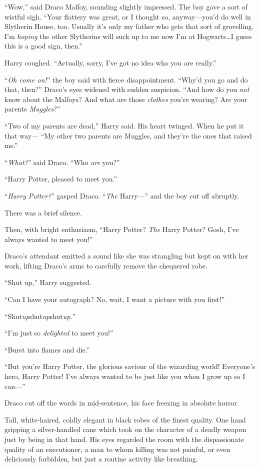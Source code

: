“Wow,” said Draco Malfoy, sounding slightly impressed. The boy gave a sort of wistful sigh. “Your flattery was great, or I thought so, anyway—you’d do well in Slytherin House, too. Usually it’s only my father who gets that sort of grovelling. I’m \emph{hoping} the other Slytherins will suck up to me now I’m at Hogwarts…I guess this is a good sign, then.”

Harry coughed. “Actually, sorry, I’ve got no idea who you are really.”

“\emph{Oh come on!}” the boy said with fierce disappointment. “Why’d you go and do that, then?” Draco’s eyes widened with sudden suspicion. “And how do you \emph{not} know about the Malfoys? And what are those \emph{clothes} you’re wearing? Are your parents \emph{Muggles}?”

“Two of my parents are dead,” Harry said. His heart twinged. When he put it that way— “My other two parents are Muggles, and they’re the ones that raised me.”

“\emph{What?}” said Draco. “Who \emph{are} you?”

“Harry Potter, pleased to meet you.”

“\emph{Harry Potter?}” gasped Draco. “\emph{The} Harry—” and the boy cut off abruptly.

There was a brief silence.

Then, with bright enthusiasm, “Harry Potter? \emph{The} Harry Potter? Gosh, I’ve always wanted to meet you!”

Draco’s attendant emitted a sound like she was strangling but kept on with her work, lifting Draco’s arms to carefully remove the chequered robe.

“Shut up,” Harry suggested.

“Can I have your autograph? No, wait, I want a picture with you first!”

“Shut\emph{up}shut\emph{up}shut\emph{up.}”

“I’m just so \emph{delighted} to meet you!”

“Burst into flames and die.”

“But you’re Harry Potter, the glorious saviour of the wizarding world! Everyone’s hero, Harry Potter! I’ve always wanted to be just like you when I grow up so I can—”

Draco cut off the words in mid-sentence, his face freezing in absolute horror.

Tall, white-haired, coldly elegant in black robes of the finest quality. One hand gripping a silver-handled cane which took on the character of a deadly weapon just by being in that hand. His eyes regarded the room with the dispassionate quality of an executioner, a man to whom killing was not painful, or even deliciously forbidden, but just a routine activity like breathing.

